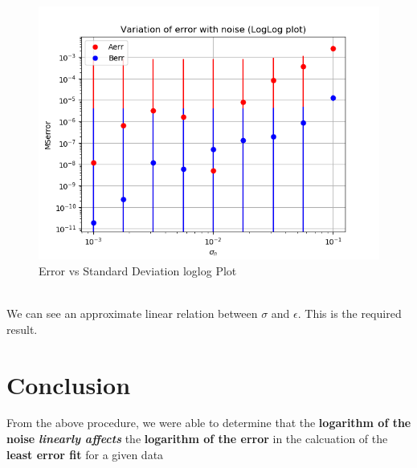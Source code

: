 \documentclass[11pt, a4paper]{article}
\begin{document}
\begin{figure}[!tbh]
    \centering
    \includegraphics[scale=0.5]{./../Extras/ErrorWithStdLogLog.png}  %
    \caption{Error vs Standard Deviation loglog Plot}
    \label{fig:errorstdlog}
\end{figure}
\\We can see an approximate linear relation between $\sigma$ and $\epsilon$. This is the required result.
\section{Conclusion}
From the above procedure, we were able to determine that the \textbf{logarithm of the noise} \textit{\textbf{linearly affects}}  the \textbf{logarithm of the error} in the calcuation of the \textbf{least error fit} for a given data
\end{document}
